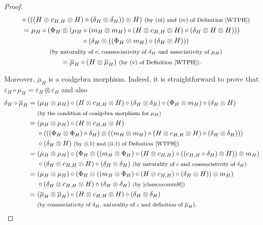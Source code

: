 \documentclass[10pt,a4paper]{amsart}
\numberwithin{equation}{section}
\begin{document}
\begin{proof}
\begin{gather*}
\quad{} \circ ( ( (H\otimes c_{H,H}\otimes H )\circ (\delta_{H}\otimes\delta_{H} ) )\otimes H )\ \text{\footnotesize\textnormal{(by (iii) and (iv) of Definition \ref{WTPH})}}\\
= \mu_{H}\circ (\Phi_{H}\otimes (\mu_{H}\circ (m_{H}\otimes m_{H} )\circ (H\otimes c_{H,H}\otimes H )\circ (\delta_{H}\otimes H\otimes H ) ) )\\
\quad{} \circ (\delta_{H}\otimes ( (\Phi_{H}\otimes m_{H} )\circ (\delta_{H}\otimes H ) ) )\\
\quad{}\, \text{\footnotesize\textnormal{(by naturality of $c$, coassociativity of $\delta_{H}$ and associativity of $\mu_{H}$)}}\\
= \overline{\mu}_{H}\circ (H\otimes\overline{\mu}_{H} )\ \text{\footnotesize\textnormal{(by (v) of Definition \ref{WTPH})}}.
\end{gather*}

Moreover, $\overline{\mu}_{H}$ is a coalgebra morphism. Indeed, it is straightforward to prove that $\varepsilon_{H}\circ \overline{\mu}_{H}=\varepsilon_{H}\otimes\varepsilon_{H}$ and also
\begin{align*}
 \delta_{H}\circ\overline{\mu}_{H}={}& (\mu_{H}\otimes\mu_{H})\circ(H\otimes c_{H,H}\otimes H)\circ(\delta_{H}\otimes\delta_{H})\circ(\Phi_{H}\otimes m_{H})\circ(\delta_{H}\otimes H)\\
 &{}\text{\footnotesize\textnormal{(by the condition of coalgebra morphism for $\mu_{H}$)}}\\
 ={}& (\mu_{H}\otimes\mu_{H})\circ(H\otimes c_{H,H}\otimes H)\\
 &{}\circ(((\Phi_{H}\otimes\Phi_{H})\circ\delta_{H})\otimes((m_{H}\otimes m_{H})\circ(H\otimes c_{H,H}\otimes H)\circ(\delta_{H}\otimes\delta_{H})))\\
 &{}\circ(\delta_{H}\otimes H) \ \text{\footnotesize\textnormal{(by (i.1) and (ii.1) of Definition \ref{WTPH})}}\\
 ={}& (\mu_{H}\otimes\mu_{H})\circ(\Phi_{H}\otimes((m_{H}\otimes \Phi_{H})\circ(H\otimes c_{H,H})\circ((c_{H,H}\circ\delta_{H})\otimes H))\otimes m_{H})\\
 &{}\circ(\delta_{H}\otimes c_{H,H}\otimes H)\circ(\delta_{H}\otimes\delta_{H})\ \text{\footnotesize\textnormal{(by naturality of $c$ and coassociativity of $\delta_{H}$)}}\\
 ={}& (\mu_{H}\otimes\mu_{H})\circ(\Phi_{H}\otimes((m_{H}\otimes \Phi_{H})\circ(H\otimes c_{H,H})\circ(\delta_{H}\otimes H))\otimes m_{H})\\
 &{}\circ(\delta_{H}\otimes c_{H,H}\otimes H)\circ(\delta_{H}\otimes\delta_{H})\ \text{\footnotesize\textnormal{(by \eqref{classcocommH})}}\\
 ={}& (\overline{\mu}_{H}\otimes\overline{\mu}_{H})\circ(H\otimes c_{H,H}\otimes H)\circ(\delta_{H}\otimes\delta_{H})\\
 &{}\text{\footnotesize\textnormal{(by coassociativity of $\delta_{H}$, naturality of $c$ and definition of $\overline{\mu}_{H}$)}}.
\end{align*}


\end{proof}
\end{document}
